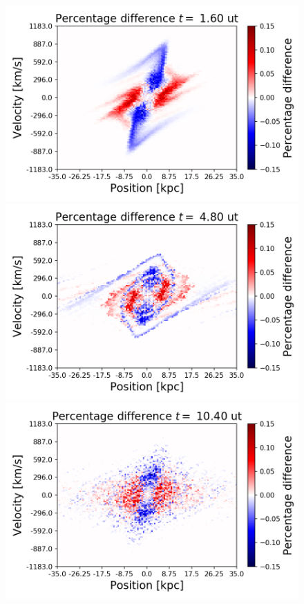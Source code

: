 {\begin{figure}[h!]
    \centering
    \includegraphics[scale=0.45]{imag/c2dPhase4.png}
    \includegraphics[scale=0.45]{imag/c2dPhase12.png}
    \includegraphics[scale=0.45]{imag/c2dPhase26.png}

\end{figure}}
